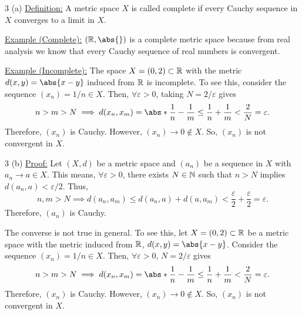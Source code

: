\documentclass[11pt]{penrose}
\begin{document}
\begin{problem}{3 (a)}
    \underline{Definition:} A metric space $X$ is called complete if every Cauchy sequence in $X$ converges to a limit in $X$.

    \underline{Example (Complete):} $(\R, \abs{})$ is a complete metric space because from real analysis we know that every Cauchy sequence of real numbers is convergent.
    
    \underline{Example (Incomplete):} The space $X = (0,2) \subset \mathbb{R}$ with the metric $d(x,y) = \abs{x-y}$ induced from $\mathbb{R}$ is incomplete. To see this, consider the sequence $(x_{n}) = 1/n \in X$. Then, $\forall\varepsilon > 0$, taking $N = 2/\varepsilon$ gives
    \begin{equation*}
        n > m > N
        \implies
        d(x_{n}, x_{m}) =
        \abs*{\frac{1}{n} - \frac{1}{m}}
        \leq \frac{1}{n} + \frac{1}{m} < \frac{2}{N} = \varepsilon.
    \end{equation*}
    Therefore, $(x_{n})$ is Cauchy. However, $(x_{n}) \to 0 \notin X$. So, $(x_{n})$ is not convergent in $X$.
\end{problem}

\begin{problem}{3 (b)}
    \underline{Proof:} Let $(X,d)$ be a metric space and $(a_{n})$ be a sequence in $X$ with $a_{n} \to a \in X$. This means, $\forall \varepsilon > 0$, there exists $N \in \mathbb{N}$ such that $n > N$ implies $d(a_{n}, a) < \varepsilon/2$. Thus,
    \begin{equation*}
        n,m > N \implies d(a_{n}, a_{m}) \leq d(a_{n}, a) + d(a, a_{m}) < \frac{\varepsilon}{2} + \frac{\varepsilon}{2} = \varepsilon.
    \end{equation*}
    Therefore, $(a_{n})$ is Cauchy.

    The converse is not true in general. To see this, let $X = (0,2) \subset \mathbb{R}$ be a metric space with the metric induced from $\mathbb{R}$, $d(x,y) = \abs{x-y}$. Consider the sequence $(x_{n}) = 1/n \in X$. Then, $\forall\varepsilon > 0$, $N = 2/\varepsilon$ gives
    \begin{equation*}
        n > m > N
        \implies
        d(x_{n}, x_{m}) =
        \abs*{\frac{1}{n} - \frac{1}{m}}
        \leq \frac{1}{n} + \frac{1}{m} < \frac{2}{N} = \varepsilon.
    \end{equation*}
    Therefore, $(x_{n})$ is Cauchy. However, $(x_{n}) \to 0 \notin X$. So, $(x_{n})$ is not convergent in $X$.
\end{problem}
\end{document}
